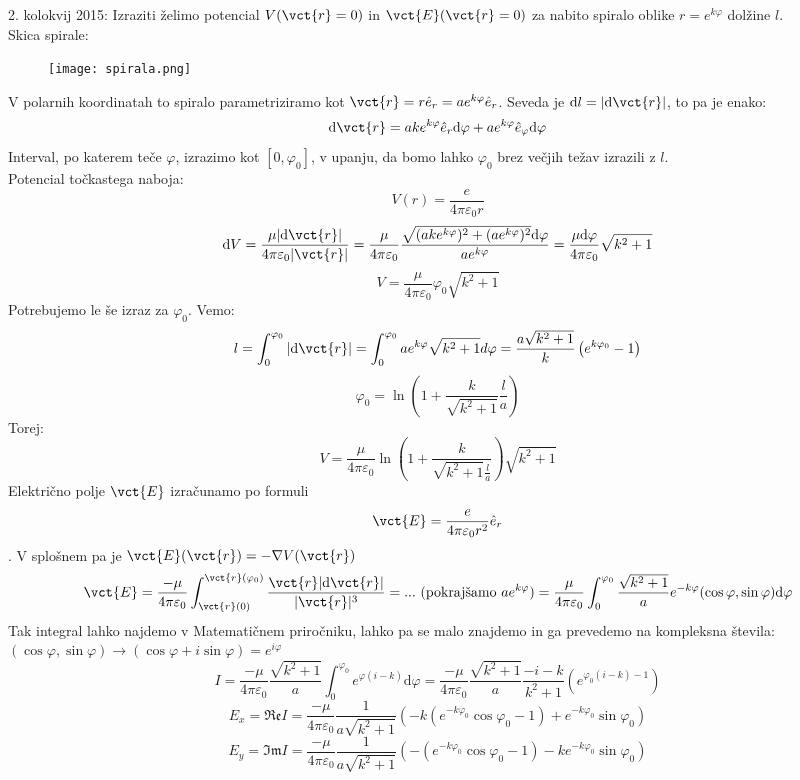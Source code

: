 \documentclass[a4paper]{article}
\newcommand{\dif}{\mathrm{d}}
\begin{document}
2. kolokvij 2015: Izraziti želimo potencial $V(\vct{r}=0)$ in $\vct{E}(\vct{r}=0)$ za nabito spiralo oblike $\displaystyle{r = e^{k\varphi}}$ dolžine $l$. \\
Skica spirale:
\begin{figure}[h!]
    \centering
    \texttt{[image: spirala.png]}
\end{figure}
\newline
V polarnih koordinatah to spiralo parametriziramo kot $\vct{r} = r\hat{e}_r = ae^{k\varphi}\hat{e}_r$. Seveda je $\dif l = |\dif\vct{r}|$, to pa je enako:
$$\dif \vct{r} = ake^{k\varphi} \hat{e}_r\dif\varphi + ae^{k\varphi}\hat{e}_{\varphi}\dif\varphi$$
Interval, po katerem teče $\varphi$, izrazimo kot $[0, \varphi_0]$, v upanju, da bomo lahko $\varphi_0$ brez večjih težav izrazili z $l$. \\
Potencial točkastega naboja: $$V(r) = \frac{e}{4\pi\varepsilon_0r}$$
$$\dif V = \frac{\mu |\dif \vct{r}|}{4\pi\varepsilon_0|\vct{r}|} = \frac{\mu}{4\pi\varepsilon_0}\frac{\sqrt{(ake^{k\varphi})^2 + (ae^{k\varphi})^2}\dif \varphi}{ae^{k\varphi}} = \frac{\mu\dif\varphi}{4\pi\varepsilon_0}\sqrt{k^2 + 1}$$
$$V = \frac{\mu}{4\pi\varepsilon_0}\varphi_0\sqrt{k^2 + 1}$$
Potrebujemo le še izraz za $\varphi_0$. Vemo:
$$l = \int_{0}^{\varphi_0}|\dif\vct{r}| = \int_{0}^{\varphi_0}ae^{k\varphi}\sqrt{k^2 + 1}d\varphi = \frac{a\sqrt{k^2 + 1}}{k}\left(e^{k\varphi_0} - 1\right)$$
$$\varphi_0 = \ln\left(1 + \frac{k}{\sqrt{k^2 + 1}}\frac{l}{a}\right)$$
Torej: $$V = \frac{\mu}{4\pi\varepsilon_0}\ln\left(1 + \frac{k}{\sqrt{k^2 + 1}\frac{l}{a}}\right)\sqrt{k^2 + 1}$$
Električno polje $\vct{E}$ izračunamo po formuli $$\vct{E} = \frac{e}{4\pi\varepsilon_0r^2}\hat{e}_r$$. V splošnem pa je $\vct{E}(\vct{r}) = -\nabla V(\vct{r})$
$$\vct{E} = \frac{-\mu}{4\pi\varepsilon_0} \int_{\vct{r}(0)}^{\vct{r}(\varphi_0)}\frac{\vct{r}|\dif\vct{r}|}{|\vct{r}|^3} = ... \text{ (pokrajšamo } ae^{k\varphi}) = \frac{\mu}{4\pi\varepsilon_0}\int_{0}^{\varphi_0}\frac{\sqrt{k^2 + 1}}{a}e^{-k\varphi}(\cos\varphi, \sin\varphi)\dif\varphi$$
Tak integral lahko najdemo v Matematičnem priročniku, lahko pa se malo znajdemo in ga prevedemo na kompleksna števila: $(\cos\varphi, \sin\varphi) \to (\cos\varphi + i\sin\varphi) = e^{i\varphi}$
$$I = \frac{-\mu}{4\pi\varepsilon_0} \frac{\sqrt{k^2 + 1}}{a} \int_{0}^{\varphi_0} e^{\varphi (i-k)}\dif\varphi = \frac{-\mu}{4\pi\varepsilon_0} \frac{\sqrt{k^2 + 1}}{a} \frac{- i - k}{k^2 + 1}\left(e^{\varphi_0(i - k) - 1}\right)$$
$$E_x = \mathfrak{Re}I = \frac{-\mu}{4\pi\varepsilon_0} \frac{1}{a\sqrt{k^2 + 1}}\left(-k(e^{-k\varphi_0}\cos\varphi_0 - 1) + e^{-k\varphi_0}\sin\varphi_0\right)$$
$$E_y = \mathfrak{Im}I = \frac{-\mu}{4\pi\varepsilon_0} \frac{1}{a\sqrt{k^2 + 1}}\left(-(e^{-k\varphi_0}\cos\varphi_0 - 1) - ke^{-k\varphi_0}\sin\varphi_0\right)$$
\end{document}
